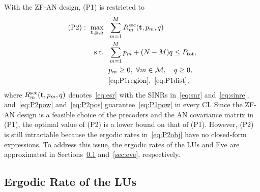 \documentclass[journal]{IEEEtran}
\begin{document}
With the ZF-AN design, (P1) is restricted to
\begin{subequations}\label{eq:P2}
\begin{align}
(\mathrm{P2}):\ \max_{\mathbf{t},\mathbf{p},q}\ \ & \sum_{m=1}^{M}R_m^{\mathrm{sec}}(\mathbf{t},p_m,q)\label{eq:P2obj}\\
\mathrm{s.t.}\ \ & \sum_{m=1}^{M}p_m+(N-M)q\le P_{\mathrm{tot}},\label{eq:P2pow}\\
& p_m\ge0,\ \forall m\in\mathcal M,\quad q\ge0,\label{eq:P2pos}\\
& \eqref{eq:P1region},\ \eqref{eq:P1dist},\nonumber
\end{align}
\end{subequations}
where $R_m^{\mathrm{sec}}(\mathbf{t},p_m,q)$ denotes~\eqref{eq:esr} with the SINRs in~\eqref{eq:snr} and~\eqref{eq:sinre}, and~\eqref{eq:P2pow} and~\eqref{eq:P2pos} guarantee~\eqref{eq:P1pow} in every CI. Since the ZF-AN design is a feasible choice of the precoders and the AN covariance matrix in (P1), the optimal value of (P2) is a lower bound on that of (P1). However, (P2) is still intractable because the ergodic rates in~\eqref{eq:P2obj} have no closed-form expressions. To address this issue, the ergodic rates of the LUs and Eve are approximated in Sections~\ref{sec:lu} and~\ref{sec:eve}, respectively.

\subsection{Ergodic Rate of the LUs}\label{sec:lu}
\end{document}
